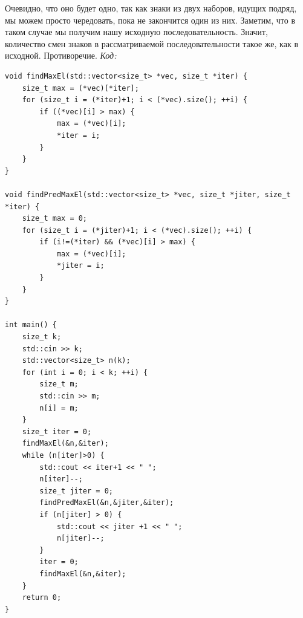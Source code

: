 Очевидно, что оно будет одно, так как знаки из двух наборов, идущих подряд, мы можем просто чередовать, пока не закончится один из них.
Заметим, что в таком случае мы получим нашу исходную последовательность. Значит, количество смен знаков в рассматриваемой последовательности
такое же, как в исходной. Противоречие.
\BgThispage
\newpage
\textit{Код:}
\small
\begin{center}
    \begin{verbatim}
void findMaxEl(std::vector<size_t> *vec, size_t *iter) {
    size_t max = (*vec)[*iter];
    for (size_t i = (*iter)+1; i < (*vec).size(); ++i) {
        if ((*vec)[i] > max) {
            max = (*vec)[i];
            *iter = i;
        }
    }
}

void findPredMaxEl(std::vector<size_t> *vec, size_t *jiter, size_t *iter) {
    size_t max = 0;
    for (size_t i = (*jiter)+1; i < (*vec).size(); ++i) {
        if (i!=(*iter) && (*vec)[i] > max) {
            max = (*vec)[i];
            *jiter = i;
        }
    }
}

int main() {
    size_t k;
    std::cin >> k;
    std::vector<size_t> n(k);
    for (int i = 0; i < k; ++i) {
        size_t m;
        std::cin >> m;
        n[i] = m;
    }
    size_t iter = 0;
    findMaxEl(&n,&iter);
    while (n[iter]>0) {
        std::cout << iter+1 << " ";
        n[iter]--;
        size_t jiter = 0;
        findPredMaxEl(&n,&jiter,&iter);
        if (n[jiter] > 0) {
            std::cout << jiter +1 << " ";
            n[jiter]--;
        }
        iter = 0;
        findMaxEl(&n,&iter);
    }
    return 0;
}
    \end{verbatim}
\end{center}
\normalsize
\BgThispage
\newpage
